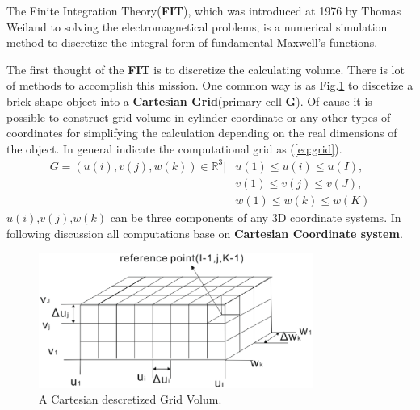 The Finite Integration Theory(\textbf{FIT}), which was introduced at 1976 by Thomas Weiland\cite{FIT_discrete_method} to solving the electromagnetical problems, is a numerical simulation method to discretize the integral form of fundamental Maxwell's functions.

The first thought of the \textbf{FIT} is to discretize the calculating volume. There is lot of methods to accomplish this mission. One common way is as Fig.\ref{fig:discretization_material} to discetize a brick-shape object into a \textbf{Cartesian Grid}(primary cell \textbf{G}). Of cause it is possible to construct grid volume in cylinder coordinate or any other types of  coordinates\cite{FIT_triangular_discretization,FDTD_nonorthogonal_grids} for simplifying the calculation depending on the real dimensions of the object. In general \cite{script_FeldSim} indicate the computational grid as (\ref{eq:grid}).
\begin{align}
G=
(u(i),v(j),w(k))\in \mathbb{R}^3|&u(1)\leq u(i)\leq u(I),\nonumber\\
													 &v(1)\leq v(j)\leq v(J),\nonumber\\ 
													 &w(1)\leq w(k)\leq w(K)
\label{eq:grid}
\end{align}
$u(i)$,$v(j)$,$w(k)$ can be three components of any 3D coordinate systems. In following discussion all computations base on \textbf{Cartesian Coordinate system}.
\begin{figure}[!ht]
\centering
\includegraphics[width=0.8\textwidth]{bilder/grid_volum}
\caption{A Cartesian descretized Grid Volum\cite{script_FeldSim}.}
\label{fig:discretization_material}
\end{figure}

